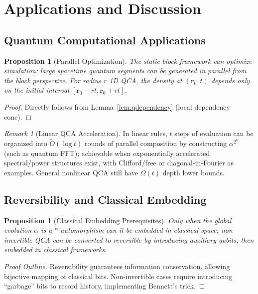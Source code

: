 \documentclass[11pt]{article}
\newtheorem{proposition}[theorem]{Proposition}
\theoremstyle{definition}
\theoremstyle{remark}
\newtheorem{remark}[theorem]{Remark}
\begin{document}
\section{Applications and Discussion}\label{sec:applications}

\subsection{Quantum Computational Applications}

\begin{proposition}[Parallel Optimization]\label{prop:qparallel}
The static block framework can optimize simulation: large spacetime quantum segments can be generated in parallel from the block perspective. For radius \( r \) 1D QCA, the density at \( (\mathbf{r}_0, t) \) depends only on the initial interval \( [\mathbf{r}_0 - rt, \mathbf{r}_0 + rt] \).
\end{proposition}

\begin{proof}
Directly follows from Lemma~\ref{lem:qdependency} (local dependency cone).
\end{proof}

\begin{remark}[Linear QCA Acceleration]
In linear rules, \( t \) steps of evaluation can be organized into \( \tilde{O}(\log t) \) rounds of parallel composition by constructing \( \alpha^{2^k} \) (such as quantum FFT); achievable when exponentially accelerated spectral/power structures exist, with Clifford/free or diagonal-in-Fourier as examples. General nonlinear QCA still have \( \Omega(t) \) depth lower bounds.
\end{remark}

\subsection{Reversibility and Classical Embedding}

\begin{proposition}[Classical Embedding Prerequisites]\label{prop:qclassical}
Only when the global evolution \( \alpha \) is a \( * \)-automorphism can it be embedded in classical space; non-invertible QCA can be converted to reversible by introducing auxiliary qubits, then embedded in classical frameworks.
\end{proposition}

\begin{proof}[Proof Outline]
Reversibility guarantees information conservation, allowing bijective mapping of classical bits. Non-invertible cases require introducing ``garbage'' bits to record history, implementing Bennett's trick.
\end{proof}
\end{document}
